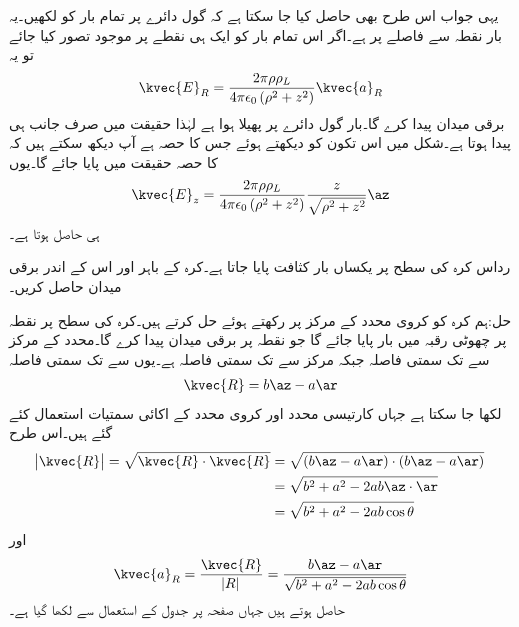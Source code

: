 یہی جواب اس طرح بھی حاصل کیا جا سکتا ہے کہ گول دائرے پر تمام بار کو  لکھیں۔یہ بار نقطہ  سے  فاصلے پر ہے۔اگر اس تمام بار کو ایک ہی نقطے   پر موجود تصور کیا جائے تو یہ
\begin{align*}
\kvec{E}_R=\frac{2\pi\rho\rho_L}{4\pi\epsilon_0 \left(\rho^2+z^2 \right)} \kvec{a}_R
\end{align*}
برقی میدان پیدا کرے گا۔بار گول دائرے پر پھیلا ہوا ہے لہٰذا حقیقت میں صرف  جانب ہی  پیدا ہوتا ہے۔شکل میں اس تکون کو دیکھتے ہوئے جس کا  حصہ ہے  آپ دیکھ سکتے ہیں کہ  کا  حصہ  حقیقت میں پایا جائے گا۔یوں 
\begin{align*}
\kvec{E}_z=\frac{2\pi\rho\rho_L}{4\pi\epsilon_0 \left(\rho^2+z^2 \right)} \frac{z}{\sqrt{\rho^2+z^2}} \az
\end{align*}
ہی حاصل ہوتا ہے۔

رداس  کرہ کی سطح پر یکساں بار کثافت  پایا جاتا ہے۔کرہ کے باہر اور اس کے اندر برقی میدان   حاصل کریں۔

حل:ہم کرہ کو کروی محدد کے مرکز پر رکھتے ہوئے حل کرتے ہیں۔کرہ کی سطح پر نقطہ  پر چھوٹی رقبہ  میں بار  پایا جائے گا جو  نقطہ  پر برقی میدان  پیدا کرے گا۔محدد کے مرکز سے  تک سمتی فاصلہ  جبکہ مرکز سے  تک سمتی فاصلہ  ہے۔یوں  سے  تک سمتی فاصلہ 
\begin{align}
\kvec{R}=b\az-a\ar
\end{align}
لکھا جا سکتا ہے جہاں کارتیسی محدد اور کروی محدد کے اکائی سمتیات استعمال کئے گئے ہیں۔اس طرح
\begin{gather}
\begin{aligned}
\abs{\kvec{R}}=\sqrt{\kvec{R} \cdot \kvec{R}}&= \sqrt{(b\az-a\ar)\cdot (b\az-a\ar)}\\
&=\sqrt{b^2+a^2-2 ab \az \cdot \ar}\\
&=\sqrt{b^2+a^2-2 ab \cos \theta}
\end{aligned}
\end{gather}
اور
\begin{align}
\kvec{a}_R=\frac{\kvec{R}}{\abs{R}}=\frac{b\az-a\ar}{\sqrt{b^2+a^2-2 ab \cos \theta}}
\end{align}
حاصل ہوتے ہیں جہاں صفحہ  پر جدول  کے استعمال سے  لکھا گیا ہے۔

